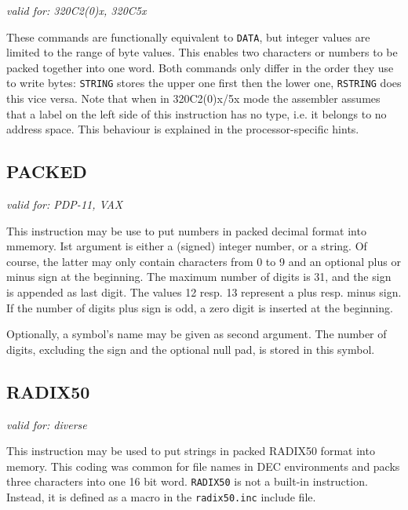 \documentclass[12pt,twoside]{report}
\makeatletter
\newcommand{\tty}[1]{{\tt #1}}
\newcommand{\ttindex}[1]{\index{#1@{\tt #1}}}
\makeatother
\begin{document}
{\em valid for: 320C2(0)x, 320C5x}

These commands are functionally equivalent to \tty{DATA}, but integer
values are limited to the range of byte values. This enables two
characters or numbers to be packed together into one word. Both commands
only differ in the order they use to write bytes: \tty{STRING} stores the
upper one first then the lower one, \tty{RSTRING} does this vice versa.
Note that when in 320C2(0)x/5x mode the assembler assumes that a label on the
left side of this instruction has no type, i.e. it belongs to no address
space.  This behaviour is explained in the processor-specific hints.


\subsection{PACKED}

{\em valid for: PDP-11, VAX}

This instruction may be use to put numbers in packed decimal format into
mmemory. Ist argument is either a (signed) integer number, or a string.  Of
course, the latter may only contain characters from 0 to 9 and an optional
plus or minus sign at the beginning.  The maximum number of digits is 31,
and the sign is appended as last digit.  The values 12 resp. 13 represent 
a plus resp. minus sign. If the number of digits plus sign is odd, a zero
digit is inserted at the beginning.

Optionally, a symbol's name may be given as second argument.  The number of
digits, excluding the sign and the optional null pad, is stored in this
symbol.


\subsection{RADIX50}
\ttindex{RADIX50}

{\em valid for: diverse}

This instruction may be used to put strings in packed RADIX50 format into
memory.  This coding was common for file names in DEC environments and packs
three characters into one 16 bit word.  {\tt RADIX50} is not a built-in
instruction.  Instead, it is defined as a macro in the {\tt radix50.inc}
include file.

\end{document}
